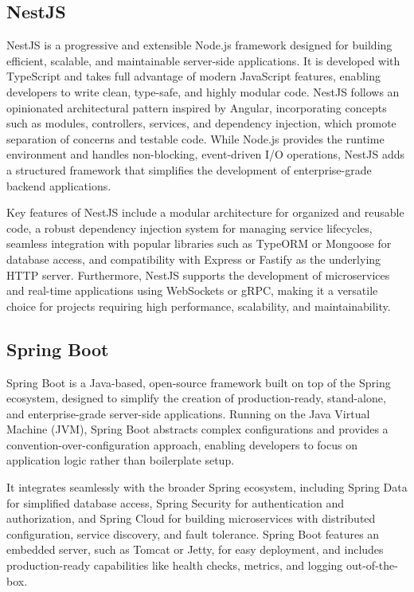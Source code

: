 \subsection{NestJS}

NestJS is a progressive and extensible Node.js framework designed for building efficient, scalable, and maintainable server-side applications. It is developed with TypeScript and takes full advantage of modern JavaScript features, enabling developers to write clean, type-safe, and highly modular code. NestJS follows an opinionated architectural pattern inspired by Angular, incorporating concepts such as modules, controllers, services, and dependency injection, which promote separation of concerns and testable code. While Node.js provides the runtime environment and handles non-blocking, event-driven I/O operations, NestJS adds a structured framework that simplifies the development of enterprise-grade backend applications.\cite{nestJS}

Key features of NestJS include a modular architecture for organized and reusable code, a robust dependency injection system for managing service lifecycles, seamless integration with popular libraries such as TypeORM or Mongoose for database access, and compatibility with Express or Fastify as the underlying HTTP server. Furthermore, NestJS supports the development of microservices and real-time applications using WebSockets or gRPC, making it a versatile choice for projects requiring high performance, scalability, and maintainability.

\subsection{Spring Boot}

Spring Boot is a Java-based, open-source framework built on top of the Spring ecosystem, designed to simplify the creation of production-ready, stand-alone, and enterprise-grade server-side applications. Running on the Java Virtual Machine (JVM), Spring Boot abstracts complex configurations and provides a convention-over-configuration approach, enabling developers to focus on application logic rather than boilerplate setup.\cite{spring_boot}

It integrates seamlessly with the broader Spring ecosystem, including Spring Data for simplified database access, Spring Security for authentication and authorization, and Spring Cloud for building microservices with distributed configuration, service discovery, and fault tolerance. Spring Boot features an embedded server, such as Tomcat or Jetty, for easy deployment, and includes production-ready capabilities like health checks, metrics, and logging out-of-the-box.  

